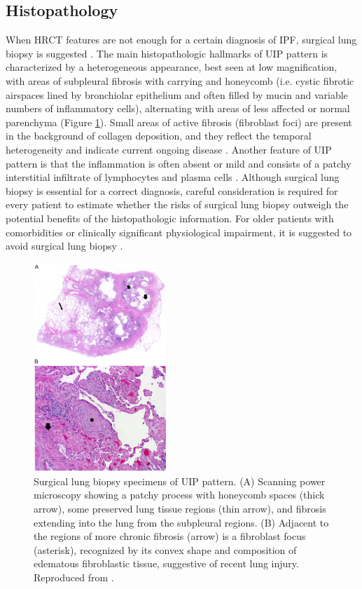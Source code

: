 \subsection{Histopathology}
When HRCT features are not enough for a certain diagnosis of IPF, surgical lung biopsy is suggested \citep{richeldi2017idiopathic}. The main histopathologic hallmarks of UIP pattern is characterized by a heterogeneous appearance, best seen at low magnification, with areas of subpleural fibrosis with carrying and honeycomb (i.e. cystic fibrotic airspaces lined by bronchiolar epithelium and often filled by mucin and variable numbers of inflammatory cells), alternating with areas of less affected or normal parenchyma \citep{ american2000idiopathic, travis2002american} (Figure \ref{fig:SurgicalLungBiopsy}). Small areas of active fibrosis (fibroblast foci) are present in the background of collagen deposition, and they reflect the temporal heterogeneity and indicate current ongoing disease \citep{king2011idiopathic}. Another feature of UIP pattern is that the inflammation is often absent or mild and consists of a patchy interstitial infiltrate of lymphocytes and plasma cells \citep{raghu2011official,king2011idiopathic}. Although surgical lung biopsy is essential for a correct diagnosis, careful consideration is required for every patient to estimate whether the risks of surgical lung biopsy outweigh the potential benefits of the histopathologic information. For older patients with comorbidities or clinically significant physiological impairment, it is suggested to avoid surgical lung biopsy \citep{richeldi2017idiopathic}.

\begin{figure}[htbp]
  \centering 
  \includegraphics[height=3.1in]{Background/Image/SurgicalLungBiopsy.png}
  \caption{ Surgical lung biopsy specimens of UIP pattern. (A) Scanning power microscopy showing a patchy process with honeycomb
spaces (thick arrow), some preserved lung tissue regions (thin arrow), and fibrosis extending into the lung from the subpleural regions. (B) Adjacent to the regions of more chronic fibrosis (arrow) is a fibroblast focus (asterisk), recognized by its convex shape and composition of edematous fibroblastic tissue, suggestive of recent lung injury. Reproduced from \citep{raghu2011official}.}
  \label{fig:SurgicalLungBiopsy}
\end{figure}


